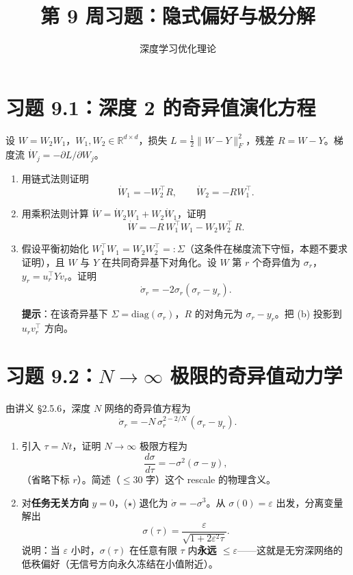 \documentclass[11pt]{ctexart}
\title{第 9 周习题：隐式偏好与极分解}
\author{深度学习优化理论}
\date{}
\begin{document}
\maketitle

\section*{习题 9.1：深度 2 的奇异值演化方程}

设 $W = W_2 W_1$，$W_1, W_2 \in \mathbb{R}^{d\times d}$，损失 $L = \tfrac{1}{2}\|W - Y\|_F^2$，残差 $R = W - Y$。梯度流 $\dot W_j = -\partial L / \partial W_j$。

\begin{enumerate}[label=(\alph*)]
    \item 用链式法则证明
    \[
        \dot W_1 = -W_2^\top R, \qquad \dot W_2 = -R W_1^\top.
    \]

    \item 用乘积法则计算 $\dot W = \dot W_2 W_1 + W_2 \dot W_1$，证明
    \[
        \dot W = -R \, W_1^\top W_1 - W_2 W_2^\top \, R.
    \]

    \item 假设平衡初始化 $W_1^\top W_1 = W_2 W_2^\top =: \Sigma$（这条件在梯度流下守恒，本题不要求证明），且 $W$ 与 $Y$ 在共同奇异基下对角化。设 $W$ 第 $r$ 个奇异值为 $\sigma_r$，$y_r = u_r^\top Y v_r$。证明
    \[
        \dot \sigma_r = -2\sigma_r(\sigma_r - y_r).
    \]

    \textbf{提示}：在该奇异基下 $\Sigma = \mathrm{diag}(\sigma_r)$，$R$ 的对角元为 $\sigma_r - y_r$。把 (b) 投影到 $u_r v_r^\top$ 方向。
\end{enumerate}

\section*{习题 9.2：$N \to \infty$ 极限的奇异值动力学}

由讲义 §2.5.6，深度 $N$ 网络的奇异值方程为
\[
    \dot\sigma_r = -N \, \sigma_r^{2 - 2/N} \, (\sigma_r - y_r).
\]

\begin{enumerate}[label=(\alph*)]
    \item 引入 $\tau = N t$，证明 $N \to \infty$ 极限方程为
    \[
        \frac{d\sigma}{d\tau} = -\sigma^2 (\sigma - y), \tag{$\star$}
    \]
    （省略下标 $r$）。简述（$\leq 30$ 字）这个 rescale 的物理含义。

    \item 对\textbf{任务无关方向} $y = 0$，($\star$) 退化为 $\dot\sigma = -\sigma^3$。从 $\sigma(0) = \varepsilon$ 出发，分离变量解出
    \[
        \sigma(\tau) = \frac{\varepsilon}{\sqrt{1 + 2\varepsilon^2 \tau}}.
    \]
    说明：当 $\varepsilon$ 小时，$\sigma(\tau)$ 在任意有限 $\tau$ 内\textbf{永远 $\leq \varepsilon$}——这就是无穷深网络的低秩偏好（无信号方向永久冻结在小值附近）。
\end{enumerate}
\end{document}

